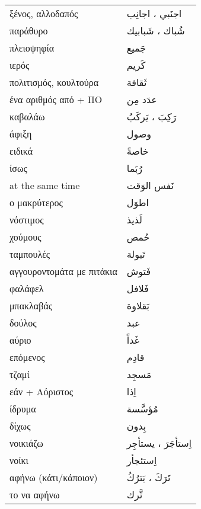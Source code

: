 \documentclass[twocolumn,a4paper]{article}
\newcommand{\ar}[1]{\textarabic{#1}}
\newcommand{\pl}{\raisebox{0.15ex}{\footnotesize ◍}}
\newcommand{\vrf}{\raisebox{0.15ex}{\footnotesize ◉}}
\newcommand{\mas}{\raisebox{0.15ex}{\footnotesize ◫}}
\begin{document}
\begin{mpsupertabular}{ P{0.5\textwidth} P{0.5\textwidth} }
ξένος, αλλοδαπός \pl         & \ar{ اجنَبي ، اجانِب } \\
παράθυρο \pl                 & \ar{ شُباك ، شَبابيك } \\
πλειοψηφία                   & \ar{ جَميع } \\
ιερός                        & \ar{ كَريم } \\
πολιτισμός, κουλτούρα        & \ar{ ثَقافة } \\
ένα αριθμός από + ΠΟ         & \ar{ عدَد مِن } \\
καβαλάω \vrf                 & \ar{ رَكِبَ ، يَركَبُ } \\
άφιξη                        & \ar{ وصول } \\
ειδικά                       & \ar{ خاصةً } \\
ίσως                         & \ar{ رُبَما } \\
at the same time             & \ar{ نَفس الوَقت } \\
ο μακρύτερος                 & \ar{ اطوَل } \\
νόστιμος                     & \ar{ لَذيذ } \\
χούμους                      & \ar{ حُمص } \\
ταμπουλές                    & \ar{ تَبولة } \\
αγγουροντομάτα με πιτάκια    & \ar{ فَتوش } \\
φαλάφελ                      & \ar{ فَلافل } \\
μπακλαβάς                    & \ar{ بَقلاوة } \\
δούλος                       & \ar{ عبد } \\
αύριο                        & \ar{ غَداً } \\
επόμενος                     & \ar{ قادِم } \\
τζαμί                        & \ar{ مَسجِد } \\
εάν + Αόριστος               & \ar{ اِذا } \\
ίδρυμα                       & \ar{ مُؤسَّسة } \\
δίχως                        & \ar{ بِدون } \\
νοικιάζω \vrf                & \ar{ اِستأجَرَ ، يستأجِر } \\
νοίκι \mas                   & \ar{ اِستئجأر } \\
αφήνω (κάτι/κάποιον) \vrf    & \ar{ تَرَكَ ، يَترُكُ } \\
το να αφήνω \mas             & \ar{ تَّرك } \\

\end{mpsupertabular}
\end{document}
